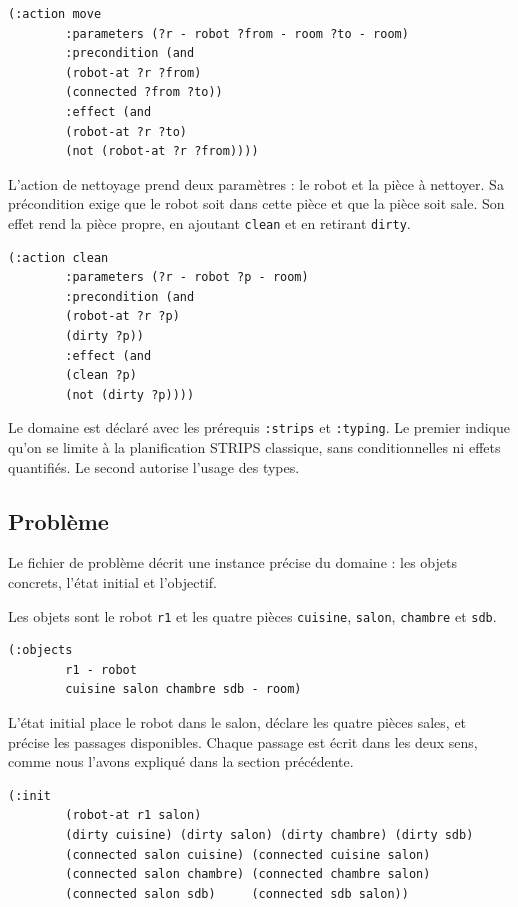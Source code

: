 \documentclass[a4paper, 11pt]{report}
\begin{document}
	\begin{lstlisting}[style=pddl, caption={Action de déplacement.}]
		(:action move
		:parameters (?r - robot ?from - room ?to - room)
		:precondition (and
		(robot-at ?r ?from)
		(connected ?from ?to))
		:effect (and
		(robot-at ?r ?to)
		(not (robot-at ?r ?from))))
	\end{lstlisting}
	
	L'action de nettoyage prend deux paramètres : le robot et la pièce à
	nettoyer. Sa précondition exige que le robot soit dans cette pièce et que
	la pièce soit sale. Son effet rend la pièce propre, en ajoutant
	\texttt{clean} et en retirant \texttt{dirty}.
	
	\begin{lstlisting}[style=pddl, caption={Action de nettoyage.}]
		(:action clean
		:parameters (?r - robot ?p - room)
		:precondition (and
		(robot-at ?r ?p)
		(dirty ?p))
		:effect (and
		(clean ?p)
		(not (dirty ?p))))
	\end{lstlisting}
	
	Le domaine est déclaré avec les prérequis \texttt{:strips} et
	\texttt{:typing}. Le premier indique qu'on se limite à la planification
	STRIPS classique, sans conditionnelles ni effets quantifiés. Le second
	autorise l'usage des types.
	
	\subsection{Problème}
	
	Le fichier de problème décrit une instance précise du domaine : les objets
	concrets, l'état initial et l'objectif.
	
	Les objets sont le robot \texttt{r1} et les quatre pièces
	\texttt{cuisine}, \texttt{salon}, \texttt{chambre} et \texttt{sdb}.
	
	\begin{lstlisting}[style=pddl, caption={Objets du problème.}]
		(:objects
		r1 - robot
		cuisine salon chambre sdb - room)
	\end{lstlisting}
	
	L'état initial place le robot dans le salon, déclare les quatre pièces
	sales, et précise les passages disponibles. Chaque passage est écrit dans
	les deux sens, comme nous l'avons expliqué dans la section précédente.
	
	\begin{lstlisting}[style=pddl, caption={État initial.}]
		(:init
		(robot-at r1 salon)
		(dirty cuisine) (dirty salon) (dirty chambre) (dirty sdb)
		(connected salon cuisine) (connected cuisine salon)
		(connected salon chambre) (connected chambre salon)
		(connected salon sdb)     (connected sdb salon))
	\end{lstlisting}
	
\end{document}
